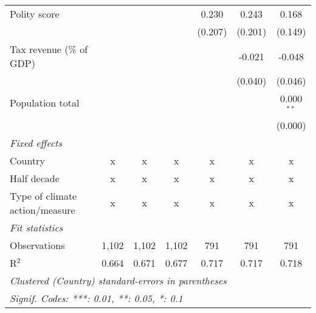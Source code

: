 \begin{tabular}{lcccccc}
   Polity score                                                 &               &                &                & 0.230          & 0.243          & 0.168\\   
                                                                &               &                &                & (0.207)        & (0.201)        & (0.149)\\   
   Tax revenue (\% of GDP)                                      &               &                &                &                & -0.021         & -0.048\\   
                                                                &               &                &                &                & (0.040)        & (0.046)\\   
   Population total                                             &               &                &                &                &                & 0.000$^{**}$\\   
                                                                &               &                &                &                &                & (0.000)\\   
   \emph{Fixed effects}\\
   Country                                                      & x             & x              & x              & x              & x              & x\\  
   Half decade                                                  & x             & x              & x              & x              & x              & x\\  
   Type of climate action/measure                               & x             & x              & x              & x              & x              & x\\  
   \midrule \emph{Fit statistics}\\
   Observations                                                 & 1,102         & 1,102          & 1,102          & 791            & 791            & 791\\  
   R$^2$                                                        & 0.664         & 0.671          & 0.677          & 0.717          & 0.717          & 0.718\\  
   \midrule
   \multicolumn{7}{l}{\emph{Clustered (Country) standard-errors in parentheses}}\\
   \multicolumn{7}{l}{\emph{Signif. Codes: ***: 0.01, **: 0.05, *: 0.1}}\\
\end{tabular}
\par\endgroup


